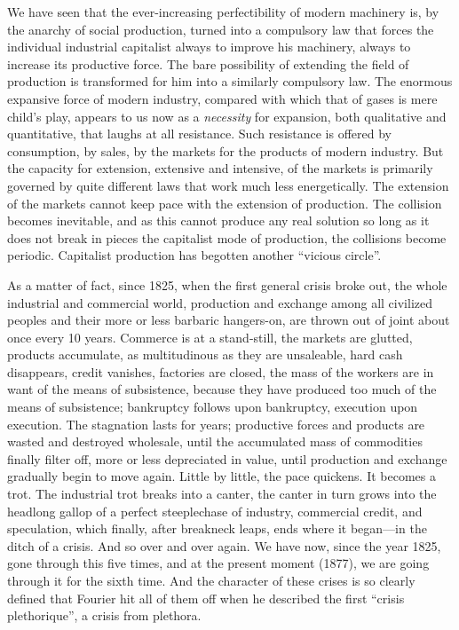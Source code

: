We have seen that the ever-increasing perfectibility of modern machinery is, by
the anarchy of social production, turned into a compulsory law that forces the
individual industrial capitalist always to improve his machinery, always to
increase its productive force. The bare possibility of extending the field of
production is transformed for him into a similarly compulsory law. The enormous
expansive force of modern industry, compared with which that of gases is mere
child's play, appears to us now as a \emph{necessity} for expansion, both
qualitative and quantitative, that laughs at all resistance. Such resistance is
offered by consumption, by sales, by the markets for the products of modern
industry. But the capacity for extension, extensive and intensive, of the
markets is primarily governed by quite different laws that work much less
energetically. The extension of the markets cannot keep pace with the extension
of production. The collision becomes inevitable, and as this cannot produce any
real solution so long as it does not break in pieces the capitalist mode of
production, the collisions become periodic. Capitalist production has begotten
another ``vicious circle''.

As a matter of fact, since 1825, when the first general crisis broke out, the
whole industrial and commercial world, production and exchange among all
civilized peoples and their more or less barbaric hangers-on, are thrown out of
joint about once every 10 years. Commerce is at a stand-still, the markets are
glutted, products accumulate, as multitudinous as they are unsaleable, hard cash
disappears, credit vanishes, factories are closed, the mass of the workers are
in want of the means of subsistence, because they have produced too much of the
means of subsistence; bankruptcy follows upon bankruptcy, execution upon
execution. The stagnation lasts for years; productive forces and products are
wasted and destroyed wholesale, until the accumulated mass of commodities
finally filter off, more or less depreciated in value, until production and
exchange gradually begin to move again. Little by little, the pace quickens. It
becomes a trot. The industrial trot breaks into a canter, the canter in turn
grows into the headlong gallop of a perfect steeplechase of industry, commercial
credit, and speculation, which finally, after breakneck leaps, ends where it
began---in the ditch of a crisis. And so over and over again. We have now, since
the year 1825, gone through this five times, and at the present moment (1877),
we are going through it for the sixth time. And the character of these crises is
so clearly defined that Fourier hit all of them off when he described the first
``crisis plethorique'', a crisis from plethora.

